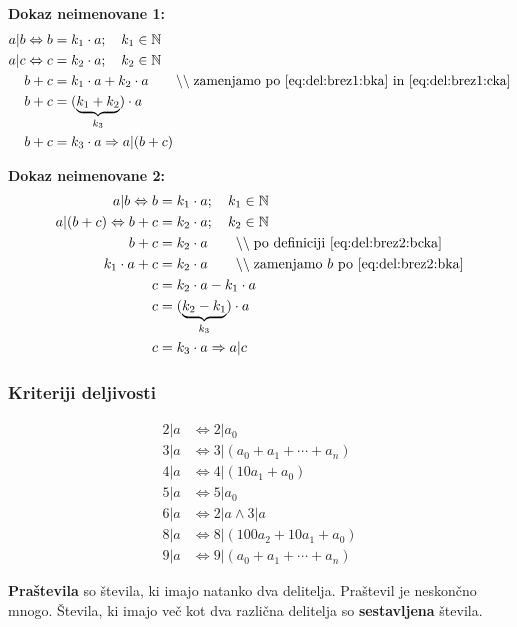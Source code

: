 \documentclass[a4paper,oneside,12pt,fleqn]{article}
\def\N{\ensuremath{\mathbb N}}
\newcommand\krat\cdot
\newcommand{\comment}[1]{\ensuremath{\qquad\backslash\backslash\;}\textnormal{#1}}
\renewcommand\implies\Rightarrow
\renewcommand\iff\Leftrightarrow
\numberwithin{equation}{section}
\begin{document}
\textbf{Dokaz neimenovane 1:}
\begin{align}
  a|b \iff b &= k_1 \krat a; \quad k_1 \in \N \label{eq:del:brez1:bka} \\
  a|c \iff c &= k_2 \krat a; \quad k_2 \in \N \label{eq:del:brez1:cka} \\
  b + c &= k_1 \krat a + k_2 \krat a \comment{zamenjamo po \eqref{eq:del:brez1:bka} in
  \eqref{eq:del:brez1:cka}} \\
  b + c &= (\underbrace{k_1 + k_2}_{k_3}) \krat a \\
  b + c &= k_3 \krat a \implies a|(b+c)
\end{align}

\textbf{Dokaz neimenovane 2:}
\begin{align}
  a|b \iff b &= k_1 \krat a; \quad k_1 \in \N \label{eq:del:brez2:bka} \\
  a|(b+c) \iff b+c &= k_2 \krat a; \quad k_2 \in \N \label{eq:del:brez2:bcka} \\
  b + c &= k_2 \krat a \comment{po definiciji \eqref{eq:del:brez2:bcka}} \\
  k_1 \krat a + c &= k_2 \krat a \comment{zamenjamo $b$ po \eqref{eq:del:brez2:bka}} \\
  c &= k_2 \krat a - k_1 \krat a \\
  c &= (\underbrace{k_2 - k_1}_{k_3}) \krat a \\
  c &= k_3 \krat a \implies a|c
\end{align}

\subsubsection{Kriteriji deljivosti}
\vspace{-1ex}
\begin{align*}
  2|a &\iff 2|a_0 \\
  3|a &\iff 3|(a_0 + a_1 + \cdots + a_n) \\
  4|a &\iff 4|(10a_1+a_0) \\
  5|a &\iff 5|a_0 \\
  6|a &\iff 2|a \land 3|a \\
  8|a &\iff 8|(100a_2 + 10a_1+a_0) \\
  9|a &\iff 9|(a_0 + a_1 + \cdots + a_n)
\end{align*}

\textbf{Praštevila} so števila, ki imajo natanko dva delitelja. Praštevil je neskončno mnogo.
Števila, ki imajo več kot dva različna delitelja so \textbf{sestavljena} števila.
\end{document}
